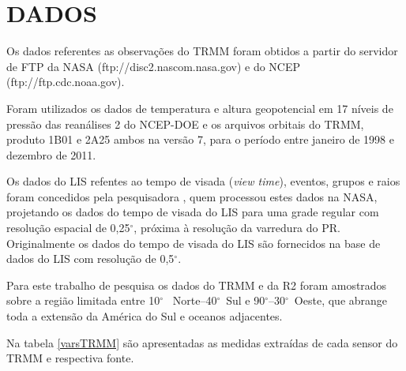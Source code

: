 \section{DADOS}

Os dados referentes as observações do TRMM foram obtidos a partir do servidor de FTP da NASA (ftp://disc2.nascom.nasa.gov) e do NCEP (ftp://ftp.cdc.noaa.gov).

Foram utilizados os dados de temperatura e altura geopotencial em 17 níveis de pressão das reanálises 2 do NCEP-DOE e os arquivos orbitais do TRMM, produto 1B01 e 2A25 ambos na versão 7, para o período entre janeiro de 1998 e dezembro de 2011. 



Os dados do LIS refentes ao tempo de visada (\textit{view time}), eventos, grupos e raios foram concedidos pela pesquisadora , quem processou estes dados na NASA, projetando os dados do tempo de visada do LIS para uma grade regular com resolução espacial de 0,25$^{\circ}$, próxima à resolução da varredura do PR. Originalmente os dados do tempo de visada do LIS são fornecidos na base de dados do LIS com resolução de 0,5$^{\circ}$. 


Para este trabalho de pesquisa os dados do TRMM e da R2 foram amostrados sobre a região limitada entre 10$^{\circ}$~ Norte--40$^{\circ}$~Sul e 90$^{\circ}$--30$^{\circ}$~Oeste, que abrange toda a extensão da América do Sul e oceanos adjacentes. 

Na tabela \ref{varsTRMM} são apresentadas as medidas extraídas de cada sensor do TRMM e respectiva fonte.


